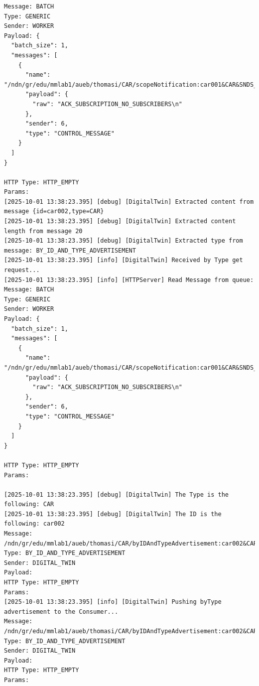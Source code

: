 \documentclass{article}
\begin{document}
\begin{lstlisting}[language=log, caption={Producer SeEDS Service logs after publishing \textit{@ids=car001,car002} to the \textit{@type=CAR} registry}, label={lst:publish-to-registry}]
Message: BATCH
Type: GENERIC
Sender: WORKER
Payload: {
  "batch_size": 1,
  "messages": [
    {
      "name": "/ndn/gr/edu/mmlab1/aueb/thomasi/CAR/scopeNotification:car001&CAR&SNDS_ID_scope_0",
      "payload": {
        "raw": "ACK_SUBSCRIPTION_NO_SUBSCRIBERS\n"
      },
      "sender": 6,
      "type": "CONTROL_MESSAGE"
    }
  ]
}

HTTP Type: HTTP_EMPTY
Params:
[2025-10-01 13:38:23.395] [debug] [DigitalTwin] Extracted content from message {id=car002,type=CAR}
[2025-10-01 13:38:23.395] [debug] [DigitalTwin] Extracted content length from message 20
[2025-10-01 13:38:23.395] [debug] [DigitalTwin] Extracted type from message: BY_ID_AND_TYPE_ADVERTISEMENT
[2025-10-01 13:38:23.395] [info] [DigitalTwin] Received by Type get request...
[2025-10-01 13:38:23.395] [info] [HTTPServer] Read Message from queue:
Message: BATCH
Type: GENERIC
Sender: WORKER
Payload: {
  "batch_size": 1,
  "messages": [
    {
      "name": "/ndn/gr/edu/mmlab1/aueb/thomasi/CAR/scopeNotification:car001&CAR&SNDS_ID_scope_0",
      "payload": {
        "raw": "ACK_SUBSCRIPTION_NO_SUBSCRIBERS\n"
      },
      "sender": 6,
      "type": "CONTROL_MESSAGE"
    }
  ]
}

HTTP Type: HTTP_EMPTY
Params:

[2025-10-01 13:38:23.395] [debug] [DigitalTwin] The Type is the following: CAR
[2025-10-01 13:38:23.395] [debug] [DigitalTwin] The ID is the following: car002
Message: /ndn/gr/edu/mmlab1/aueb/thomasi/CAR/byIDAndTypeAdvertisement:car002&CAR
Type: BY_ID_AND_TYPE_ADVERTISEMENT
Sender: DIGITAL_TWIN
Payload: 
HTTP Type: HTTP_EMPTY
Params:
[2025-10-01 13:38:23.395] [info] [DigitalTwin] Pushing byType advertisement to the Consumer...
Message: /ndn/gr/edu/mmlab1/aueb/thomasi/CAR/byIDAndTypeAdvertisement:car002&CAR
Type: BY_ID_AND_TYPE_ADVERTISEMENT
Sender: DIGITAL_TWIN
Payload: 
HTTP Type: HTTP_EMPTY
Params:


\end{lstlisting}
\end{document}

